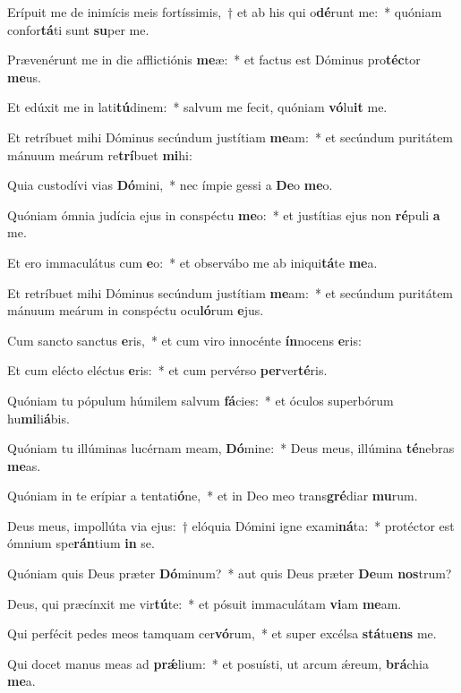 \item Erípuit me de inimícis meis fortíssimis,~† et ab his qui o\textbf{dé}runt me:~* quóniam confor\textbf{tá}ti sunt \textbf{su}per me.
\item Prævenérunt me in die afflictiónis \textbf{me}æ:~* et factus est Dóminus pro\textbf{téc}tor \textbf{me}us.
\item Et edúxit me in lati\textbf{tú}dinem:~* salvum me fecit, quóniam \textbf{vó}lu\textbf{it} me.
\item Et retríbuet mihi Dóminus secúndum justítiam \textbf{me}am:~* et secúndum puritátem mánuum meárum re\textbf{trí}buet \textbf{mi}hi:
\item Quia custodívi vias \textbf{Dó}mini,~* nec ímpie gessi a \textbf{De}o \textbf{me}o.
\item Quóniam ómnia judícia ejus in conspéctu \textbf{me}o:~* et justítias ejus non \textbf{ré}puli \textbf{a} me.
\item Et ero immaculátus cum \textbf{e}o:~* et observábo me ab iniqui\textbf{tá}te \textbf{me}a.
\item Et retríbuet mihi Dóminus secúndum justítiam \textbf{me}am:~* et secúndum puritátem mánuum meárum in conspéctu ocu\textbf{ló}rum \textbf{e}jus.
\item Cum sancto sanctus \textbf{e}ris,~* et cum viro innocénte \textbf{ín}nocens \textbf{e}ris:
\item Et cum elécto eléctus \textbf{e}ris:~* et cum pervérso \textbf{per}ver\textbf{té}ris.
\item Quóniam tu pópulum húmilem salvum \textbf{fá}cies:~* et óculos superbórum hu\textbf{mi}li\textbf{á}bis.
\item Quóniam tu illúminas lucérnam meam, \textbf{Dó}mine:~* Deus meus, illúmina \textbf{té}nebras \textbf{me}as.
\item Quóniam in te erípiar a tentati\textbf{ó}ne,~* et in Deo meo trans\textbf{gré}diar \textbf{mu}rum.
\item Deus meus, impollúta via ejus:~† elóquia Dómini igne exami\textbf{ná}ta:~* protéctor est ómnium spe\textbf{rán}tium \textbf{in} se.
\item Quóniam quis Deus præter \textbf{Dó}minum?~* aut quis Deus præter \textbf{De}um \textbf{nos}trum?
\item Deus, qui præcínxit me vir\textbf{tú}te:~* et pósuit immaculátam \textbf{vi}am \textbf{me}am.
\item Qui perfécit pedes meos tamquam cer\textbf{vó}rum,~* et super excélsa \textbf{stá}tu\textbf{ens} me.
\item Qui docet manus meas ad \textbf{prǽ}lium:~* et posuísti, ut arcum ǽreum, \textbf{brá}chia \textbf{me}a.
